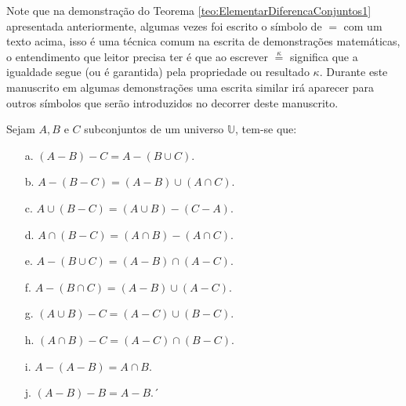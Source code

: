 \begin{rema}
	Note que na demonstração do Teorema \ref{teo:ElementarDiferencaConjuntos1} apresentada anteriormente, algumas vezes foi escrito o símbolo de $=$ com um texto acima, isso é uma técnica comum na escrita de demonstrações matemáticas, o entendimento que leitor precisa ter é que ao escrever $\stackrel{\kappa}{=}$ significa que a igualdade segue (ou é garantida) pela propriedade ou resultado $\kappa$. Durante este manuscrito em algumas demonstrações uma escrita similar irá aparecer para outros símbolos que serão introduzidos no decorrer deste manuscrito.
\end{rema}

\begin{theorem}\label{teo:ElementarDiferencaConjuntos2}
	Sejam $A, B$ e $C$ subconjuntos de um universo $\mathbb{U}$, tem-se que:
	\begin{itemize}
		\item[a.] $(A - B) - C = A - (B \cup C)$.
		\item[b.] $A - (B - C) = (A - B) \cup (A \cap C)$.
		\item[c.] $A \cup (B - C) = (A \cup B) - (C - A)$.
		\item[d.] $A \cap (B - C) = (A \cap B) - (A \cap C)$.
		\item[e.] $A - (B \cup C) = (A - B) \cap (A - C)$.
		\item[f.] $A - (B \cap C) = (A - B) \cup (A - C)$.
		\item[g.] $(A \cup B) - C = (A - C) \cup (B - C)$.
		\item[h.] $(A \cap B) - C = (A - C) \cap (B - C)$.
		\item[i.] $A - (A - B) = A \cap B$.
		\item[j.] $(A - B) - B = A - B$.´
	\end{itemize}
\end{theorem}

